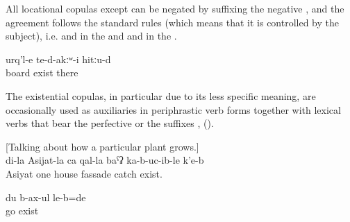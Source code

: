 All locational copulas except  can be negated by suffixing the negative , and the  agreement follows the standard rules (which means that it is controlled by the subject), i.e.  and   in the  and  and  in the  .
%
\begin{exe}
	\ex	\label{ex:There were no boards there}
	\gll	urq'l-e	te-d-akːʷ-i	hitːu-d\\
		board	exist	there\\
	\glt	{}
\end{exe}

The existential copulas, in particular  due to its less specific meaning, are occasionally used as auxiliaries in periphrastic verb forms together with lexical verbs that bear the perfective or the  suffixes ,  ().
%
\begin{exe}
	\ex	\label{ex:[Talking about how a particular plant grows.] ‎‎[It can become large], at my Asjiat's place it covered one wall of the house}
	[Talking about how a particular plant grows.]\\
	\gll	di-la	Asijat-la	ca	qal-la	baˁʡ	ka-b-uc-ib-le	k'e-b\\
			Asiyat	one	house	fassade	catch	exist.\\
	\glt	{}

	\ex	\label{ex:[at the time when the fox was born], I went run around (said the wolf)}
	\gll	du	b-ax-ul	le-b=de\\
			go	exist\\
	\glt	{}
\end{exe}




